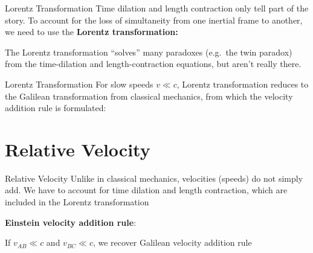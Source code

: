 \documentclass[12pt,compress,aspectratio=169]{beamer}
\begin{document}
\begin{frame}{Lorentz Transformation}
  Time dilation and length contraction only tell part of the story. To account
  for the loss of simultaneity from one inertial frame to another, we need to
  use the \textbf{Lorentz transformation:}

  
  \vspace{-.1in}The Lorentz transformation ``solves'' many paradoxes
  (e.g.\ the twin paradox) from the time-dilation and
  length-contraction equations, but aren't really there.
\end{frame}



\begin{frame}{Lorentz Transformation}
  For slow speeds $v\ll c$, Lorentz transformation reduces to the Galilean
  transformation from classical mechanics, from which the velocity addition
  rule is formulated:

  \vspace{-.45in}{\Large
    \begin{align*}
      x' &= x-vt\\
      y' &= y\\
      z' &= z\\
      t' &= t'
    \end{align*}
  }
\end{frame}



\section{Relative Velocity}

\begin{frame}{Relative Velocity}
  Unlike in classical mechanics, velocities (speeds) do not simply add. We have
  to account for time dilation and length contraction, which are included in
  the Lorentz transformation

  \vspace{.15in}\textbf{Einstein velocity addition rule}:


  \vspace{.1in} If $v_{AB}\ll c$ and $v_{BC}\ll c$, we recover Galilean
  velocity addition rule
\end{frame}
\end{document}

